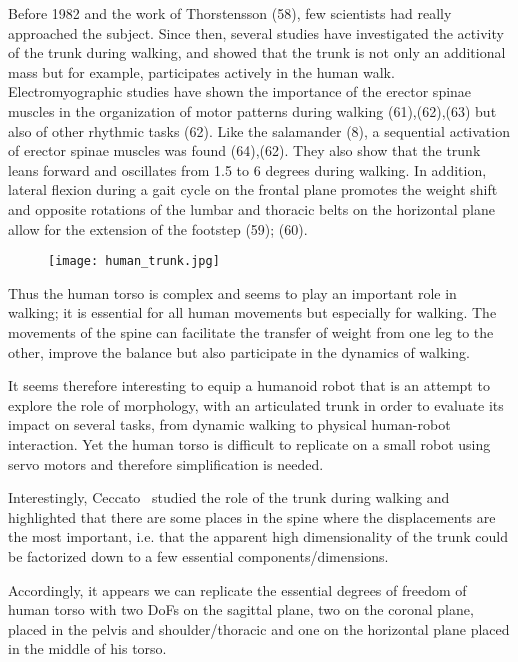 Before 1982 and the work of Thorstensson (58), few scientists had really approached the subject. Since then, several studies have investigated the activity of the trunk during walking, and showed that the trunk is not only an additional mass but for example, participates actively in the human walk.
Electromyographic studies have shown the importance of the erector spinae muscles in the organization of motor patterns during walking (61),(62),(63) but also of other rhythmic tasks (62). Like the salamander (8), a sequential activation of erector spinae muscles was found (64),(62).
They also show that the trunk leans forward and oscillates from 1.5 to 6 degrees during walking. In addition, lateral flexion during a gait cycle on the frontal plane promotes the weight shift and opposite rotations of the lumbar and thoracic belts on the horizontal plane allow for the extension of the footstep (59); (60).

\begin{figure}[ht]
    \begin{center}
        \texttt{[image: human\_trunk.jpg]}
    \end{center}
    \caption{}
    \label{fig:human_spine_system}
\end{figure}

Thus the human torso is complex and seems to play an important role in walking; it is essential for all human movements but especially for walking. The movements of the spine can facilitate the transfer of weight from one leg to the other, improve the balance but also participate in the dynamics of walking.

It seems therefore interesting to equip a humanoid robot that is an attempt to explore the role of morphology, with an articulated trunk in order to evaluate its impact on several tasks, from dynamic walking to physical human-robot interaction. Yet the human torso is difficult to replicate on a small robot using servo motors and therefore simplification is needed.

Interestingly, Ceccato~\parencite{ceccatoPlos09} studied the role of the trunk during walking and highlighted that there are some places in the spine where the displacements are the most important, i.e. that the apparent high dimensionality of the trunk could be factorized down to a few essential components/dimensions.

Accordingly, it appears we can replicate the essential degrees of freedom of human torso with two DoFs on the sagittal plane, two on the coronal plane, placed in the pelvis and shoulder/thoracic and one on the horizontal plane placed in the middle of his torso.


